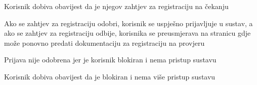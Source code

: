 \begin{packed_item}
\begin{packed_item}
\begin{packed_enum}
									\item Korisnik dobiva obavijest da je njegov zahtjev za registraciju na čekanju  
									\item Ako se zahtjev za registraciju odobri, korisnik se uspješno prijavljuje u sustav, a ako se zahtjev za registraciju odbije, korisnika se preusmjerava na stranicu gdje može ponovno predati dokumentaciju za registraciju na provjeru 
									
								\end{packed_enum}
									\item[4.b] Prijava nije odobrena jer je korisnik blokiran i nema pristup sustavu 
								\item[] \begin{packed_enum}
									
									\item Korisnik dobiva obavijest da je blokiran i nema više pristup sustavu   
									
									
								\end{packed_enum}
								
								
							\end{packed_item}
						\end{packed_item}
						\noindent {}
